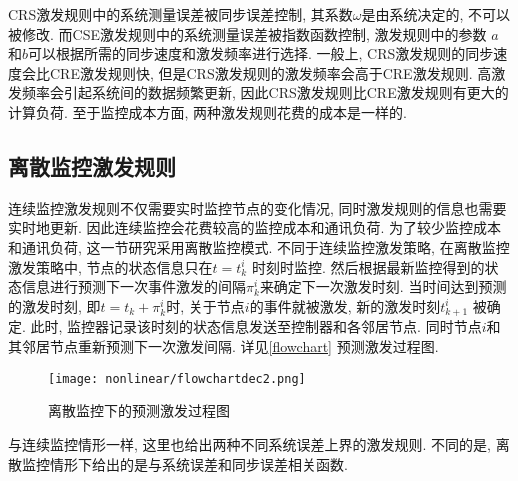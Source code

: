        \begin{rem}
           CRS激发规则中的系统测量误差被同步误差控制, 其系数$\omega$是由系统决定的, 不可以被修改. 而CSE激发规则中的系统测量误差被指数函数控制, 激发规则中的参数 $a$和$b$可以根据所需的同步速度和激发频率进行选择. 一般上, CRS激发规则的同步速度会比CRE激发规则快, 但是CRS激发规则的激发频率会高于CRE激发规则. 高激发频率会引起系统间的数据频繁更新, 因此CRS激发规则比CRE激发规则有更大的计算负荷. 至于监控成本方面, 两种激发规则花费的成本是一样的.
        \end{rem}

\subsection{离散监控激发规则}

        连续监控激发规则不仅需要实时监控节点的变化情况, 同时激发规则的信息也需要实时地更新. 因此连续监控会花费较高的监控成本和通讯负荷. 为了较少监控成本和通讯负荷, 这一节研究采用离散监控模式. 不同于连续监控激发策略, 在离散监控激发策略中, 节点的状态信息只在$t=t^i_k$ 时刻时监控. 然后根据最新监控得到的状态信息进行预测下一次事件激发的间隔$\pi_k^i$来确定下一次激发时刻. 当时间达到预测的激发时刻, 即$t=t_k+\pi_k^i$时, 关于节点$i$的事件就被激发, 新的激发时刻$t^i_{k+1}$ 被确定. 此时, 监控器记录该时刻的状态信息发送至控制器和各邻居节点. 同时节点$i$和其邻居节点重新预测下一次激发间隔. 详见\autoref{flowchart} 预测激发过程图.
        \begin{figure}[!htp]
        \setlength{\abovecaptionskip}{-1cm}
        \begin{center}
           {\texttt{[image: nonlinear/flowchartdec2.png]}}
        \end{center}
        \caption{离散监控下的预测激发过程图}\label{flowchart}
        \end{figure}

        与连续监控情形一样, 这里也给出两种不同系统误差上界的激发规则. 不同的是, 离散监控情形下给出的是与系统误差和同步误差相关函数.

